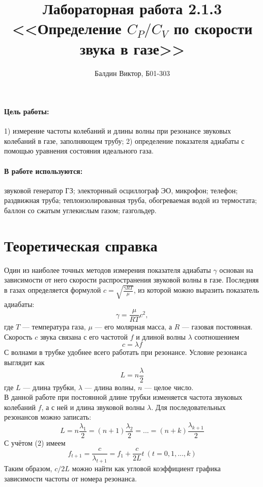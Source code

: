 \documentclass[12pt]{article}
\title{ 
Лабораторная работа 2.1.3 \\ <<Определение $C_P/C_V$ по скорости звука в
газе>> 
}
\author{Балдин Виктор, Б01-303}
\begin{document}
 
\maketitle

\paragraph{Цель работы:} 1) измерение частоты колебаний и длины волны при
резонансе звуковых колебаний в газе, заполняющем трубу; 2) определение
показателя адиабаты с помощью уравнения состояния идеального газа.  
\paragraph{В работе используются:} звуковой генератор ГЗ; электорнный 
осциллограф ЭО, микрофон; телефон; раздвижная труба; теплоизолированная труба, 
обогреваемая водой из термостата; баллон со сжатым углекислым газом; 
газгольдер.

\section{Теоретическая справка} Один из наиболее точных методов измерения
показателя адиабаты $\gamma$ основан на зависимости от него скорости
распространения звуковой волны в газе. Последняя в газах определяется формулой
$c = \sqrt{\frac{\gamma RT}{\mu}}$, из которой можно выразить показатель
адиабаты: 
\begin{equation} 
\gamma = \frac{\mu}{RT}c^2, 
\end{equation} где $T$
--- температура газа, $\mu$ --- его молярная масса, а $R$ --- газовая
постоянная. \\ Скорость $c$ звука связана с его частотой $f$ и длиной волны
$\lambda$ соотношением 
\begin{equation} 
c = \lambda f
\end{equation} 
С волнами
в трубке удобнее всего работать при резонансе. Условие резонанса выглядит как
\begin{equation} 
L = n\frac{\lambda}{2}
\end{equation} где $L$ --- длина
трубки, $\lambda$ --- длина волны, $n$ --- целое число.\\ В данной работе при
постоянной длине трубки изменяется частота звуковых колебаний $f$, а с ней и
длина звуковой волны $\lambda$. Для последовательных резонансов можно записать:
\begin{equation} 
L = n\frac{\lambda_1}{2} = (n + 1)\frac{\lambda_2}{2} = ... =
(n + k)\frac{\lambda_{k + 1}}{2} 
\end{equation} 
С учётом (2) имеем
\begin{equation} 
f_{t+1} = \frac{c}{\lambda_{t+1}} = f_1 + \frac{c}{2L}t~ (t =
0, 1,..., k) 
\end{equation} 
Таким образом, $c/2L$ можно найти как угловой
коэффициент графика зависимости частоты от номера резонанса.
\end{document}
